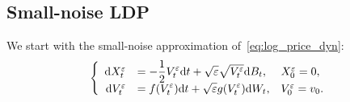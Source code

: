 

\subsection{Small-noise LDP}\label{sec:SmallNoiseLDP}
We start with the small-noise approximation of~\eqref{eq:log_price_dyn}:
\begin{equation}\label{eq:log_price_dynNoise}
\left\{
\begin{array}{rll}
\mathrm{d} X_t^\varepsilon & = \displaystyle  -\frac{1}{2}V_t^\varepsilon \mathrm{d} t + \sqrt{\varepsilon}\sqrt{V_t^\varepsilon} \mathrm{d} B_t, & X_0^\varepsilon = 0,\\
\mathrm{d} V_t^\varepsilon & = \displaystyle   f(V_t^\varepsilon)\mathrm{d} t + \sqrt{\varepsilon} g(V_t^\varepsilon)\mathrm{d} W_t, & V_0^\varepsilon = v_0.
\end{array}
\right.
\end{equation}


